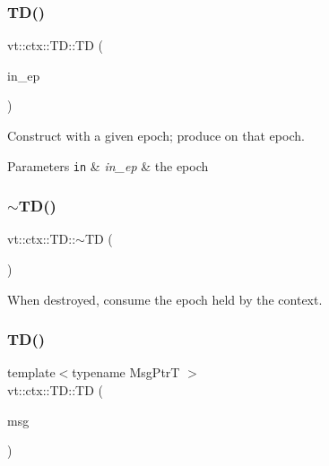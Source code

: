 \subsubsection{\texorpdfstring{T\+D()}{TD()}\hspace{0.1cm}{\footnotesize\ttfamily [1/2]}}
{\footnotesize\ttfamily vt\+::ctx\+::\+T\+D\+::\+TD (\begin{DoxyParamCaption}\item[{\hyperlink{namespacevt_a985a5adf291c34a3ca263b3378388236}{Epoch\+Type}}]{in\+\_\+ep }\end{DoxyParamCaption})\hspace{0.3cm}{\ttfamily [explicit]}}



Construct with a given epoch; produce on that epoch. 


\begin{DoxyParams}[1]{Parameters}
\mbox{\tt in}  & {\em in\+\_\+ep} & the epoch \\
\hline
\end{DoxyParams}
\mbox{\label{structvt_1_1ctx_1_1_t_d_a7682445c6790c8176124c080c3ca340c}} 
\subsubsection{\texorpdfstring{$\sim$\+T\+D()}{~TD()}}
{\footnotesize\ttfamily vt\+::ctx\+::\+T\+D\+::$\sim$\+TD (\begin{DoxyParamCaption}{ }\end{DoxyParamCaption})\hspace{0.3cm}{\ttfamily [virtual]}}



When destroyed, consume the epoch held by the context. 

\mbox{\label{structvt_1_1ctx_1_1_t_d_a59c6dbce4737da7d99a9175be2ed9053}} 
\subsubsection{\texorpdfstring{T\+D()}{TD()}\hspace{0.1cm}{\footnotesize\ttfamily [2/2]}}
{\footnotesize\ttfamily template$<$typename Msg\+PtrT $>$ \\
vt\+::ctx\+::\+T\+D\+::\+TD (\begin{DoxyParamCaption}\item[{Msg\+PtrT}]{msg }\end{DoxyParamCaption})\hspace{0.3cm}{\ttfamily [explicit]}}



